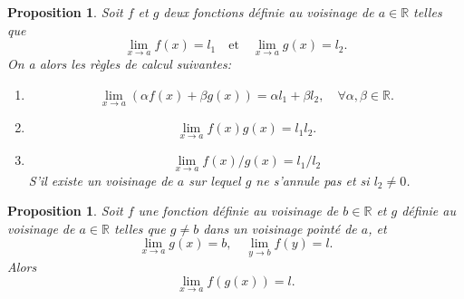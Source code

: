 \documentclass[a4paper, 12pt, french, twoside]{article}
\newtheorem{proposition}[theorem]{Proposition}
\newcommand{\Rr}{{\mathbb{R}}}
\begin{document}
\begin{proposition}
    Soit $f$ et $g$ deux fonctions définie au voisinage de $a\in \Rr$ telles que \[
    \lim_{x\rightarrow a }f(x)=l_1 \quad \text{et} \quad \lim_{x\rightarrow a }g(x)=l_2.
    \]
    On a alors les règles de calcul suivantes:
    \begin{enumerate}
        \item \[
        \lim_{x\rightarrow a }(\alpha f(x) +\beta g(x))=\alpha l_1+\beta l_2, \quad\forall\alpha,\beta\in\Rr .
        \]
        \item \[
        \lim_{x\rightarrow a }f(x)g(x)=l_1l_2.
        \]
        \item $$
        \lim_{x\rightarrow a }f(x)/g(x)=l_1/l_2 $$
        S'il existe un voisinage de $a$ sur lequel $g$ ne s'annule pas et si $l_2\neq 0$.
        
    \end{enumerate}
\end{proposition}
\begin{proposition}
    Soit $f$ une fonction définie au voisinage de $b\in\Rr$ et $g$ définie au voisinage de $a\in\Rr$ telles que $g\neq b$ dans un voisinage pointé de $a$, et 
    \[
    \lim_{x\rightarrow a}g(x)=b, \quad \lim_{y\rightarrow b}f(y)=l.
    \]
    Alors
    \[
    \lim_{x\rightarrow a}f(g(x))=l.
    \]
\end{proposition}
\end{document}
